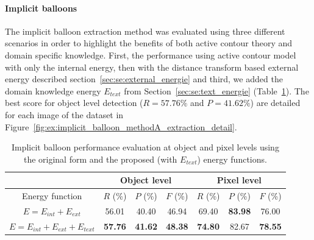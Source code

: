 

\paragraph{Implicit balloons} %
\label{par:ex:implicit_balloons_reminder}

The implicit balloon extraction method was evaluated using three different scenarios in order to highlight the benefits of both active contour theory and domain specific knowledge.
First, the performance using active contour model with only the internal energy, then with the distance transform based external energy described section~\ref{sec:se:external_energie} and third, we added the domain knowledge energy $E_{text}$ from Section~\ref{sec:se:text_energie} (Table~\ref{tab:ex:implicit_balloon_performance_object_pixel_comparison}).
The best score for object level detection ($R=57.76\%$ and $P=41.62\%$) are detailed for each image of the dataset in Figure~\ref{fig:ex:implicit_balloon_methodA_extraction_detail}.



\begin{table}[h]
  \normalsize
  \centering
  \caption[Implicit balloon performance evaluation at object and pixel levels using the original form and the proposed energy functions]{Implicit balloon performance evaluation at object and pixel levels using the original form and the proposed (with $E_{text}$) energy functions.}
  \begin{tabular}{|c|c|c|c|c|c|c|}
  \hline
    & \multicolumn{3}{|c|}{Object level}  & \multicolumn{3}{|c|}{Pixel level}   \\
  \hline
  Energy function  &  $ R$ (\%)  & $P$ (\%)& $F$ (\%)   &  $R$ (\%)  & $P$ (\%)   & $F$ (\%)\\
  \hline

   $E = E_{int} + E_{ext}$    & 56.01       & 40.40     & 46.94       & 69.40  & \textbf{83.98} & 76.00   \\
  \hline
  $E = E_{int} + E_{ext} + E_{text}$   & \textbf{57.76} & \textbf{41.62} & \textbf{48.38} & \textbf{74.80} & 82.67 & \textbf{78.55}    \\
  \hline
  \end{tabular}
      \label{tab:ex:implicit_balloon_performance_object_pixel_comparison}
\end{table}%


